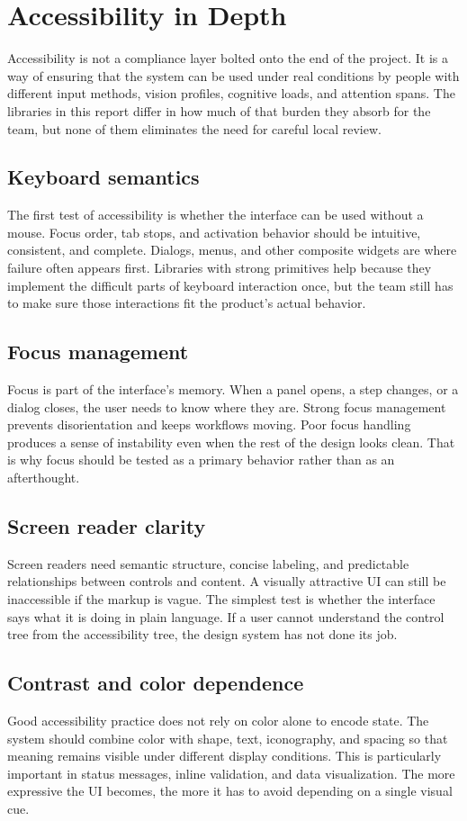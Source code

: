 \documentclass[11pt,twoside,a4paper]{article}
\begin{document}
\section{Accessibility in Depth}
Accessibility is not a compliance layer bolted onto the end of the project. It is a way of ensuring that the system can be used under real conditions by people with different input methods, vision profiles, cognitive loads, and attention spans. The libraries in this report differ in how much of that burden they absorb for the team, but none of them eliminates the need for careful local review.

\subsection{Keyboard semantics}
The first test of accessibility is whether the interface can be used without a mouse. Focus order, tab stops, and activation behavior should be intuitive, consistent, and complete. Dialogs, menus, and other composite widgets are where failure often appears first. Libraries with strong primitives help because they implement the difficult parts of keyboard interaction once, but the team still has to make sure those interactions fit the product's actual behavior.

\subsection{Focus management}
Focus is part of the interface's memory. When a panel opens, a step changes, or a dialog closes, the user needs to know where they are. Strong focus management prevents disorientation and keeps workflows moving. Poor focus handling produces a sense of instability even when the rest of the design looks clean. That is why focus should be tested as a primary behavior rather than as an afterthought.

\subsection{Screen reader clarity}
Screen readers need semantic structure, concise labeling, and predictable relationships between controls and content. A visually attractive UI can still be inaccessible if the markup is vague. The simplest test is whether the interface says what it is doing in plain language. If a user cannot understand the control tree from the accessibility tree, the design system has not done its job.

\subsection{Contrast and color dependence}
Good accessibility practice does not rely on color alone to encode state. The system should combine color with shape, text, iconography, and spacing so that meaning remains visible under different display conditions. This is particularly important in status messages, inline validation, and data visualization. The more expressive the UI becomes, the more it has to avoid depending on a single visual cue.
\end{document}
